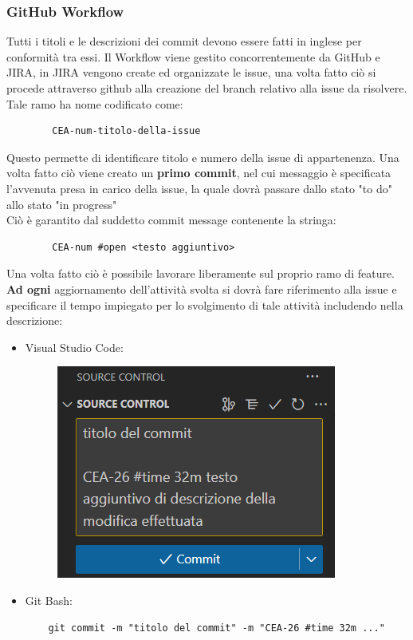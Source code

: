 	\subsubsection{GitHub Workflow}
	Tutti i titoli e le descrizioni dei commit devono essere fatti in inglese per conformità tra essi.
	\newline Il Workflow viene gestito concorrentemente da GitHub e JIRA, in JIRA vengono create ed organizzate le issue, una volta fatto ciò si procede attraverso github alla creazione del branch relativo alla issue da risolvere.\\
	Tale ramo ha nome codificato come:
	\begin{lstlisting}
		CEA-num-titolo-della-issue
	\end{lstlisting}
	Questo permette di identificare titolo e numero della issue di appartenenza. Una volta fatto ciò viene creato un \textbf{primo commit}, nel cui messaggio è specificata l'avvenuta presa in carico della issue, la quale dovrà passare dallo stato "to do" allo stato "in progress"\\
	Ciò è garantito dal suddetto commit message contenente la stringa:
	\begin{lstlisting}
		CEA-num #open <testo aggiuntivo>
	\end{lstlisting}
	Una volta fatto ciò è possibile lavorare liberamente sul proprio ramo di feature.
	\newline \textbf{Ad ogni} aggiornamento dell'attività svolta si dovrà fare riferimento alla issue e specificare il tempo impiegato per lo svolgimento di tale attività includendo nella descrizione:
	\begin{itemize}
		\item Visual Studio Code:
		\begin{figure}[h!]
			\centering
			\includegraphics[scale=0.7]{img/visual_code_example.png}
		\end{figure}
		\vspace{100pt}
		\item Git Bash:
		\begin{lstlisting}
	git commit -m "titolo del commit" -m "CEA-26 #time 32m ..."
		\end{lstlisting}
	\end{itemize}
